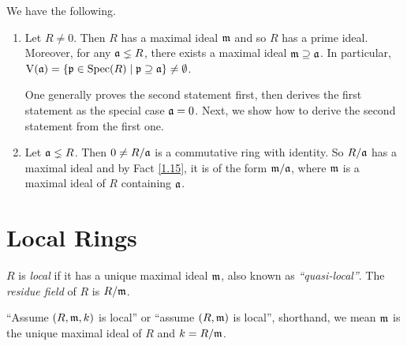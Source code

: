 \begin{fact}\label{1.17}
    We have the following.
    \begin{enumerate}
        \item\label{1.17a}
            Let $R \neq 0$. Then $R$ has a maximal ideal $\mathfrak{m}$ and so $R$ has a prime ideal. Moreover, for any $\mathfrak{a} \lneq R$, there exists a maximal ideal $\mathfrak{m} \supseteq \mathfrak{a}$. In particular, $\operatorname{V}(\mathfrak{a}) = \{\mathfrak{p} \in \operatorname{Spec}(R) \mid \mathfrak{p} \supseteq \mathfrak{a}\} \neq \emptyset$. \par
            One generally proves the second statement first, then derives the first statement as the special case $\mathfrak{a} = 0$. Next, we show how to derive the second statement from the first one.
        \item\label{1.17b}
            Let $\mathfrak{a} \lneq R$. Then $0 \neq R/\mathfrak{a}$ is a commutative ring with identity. So $R/\mathfrak{a}$ has a maximal ideal and by Fact \ref{1.15}, it is of the form $\mathfrak{m}/\mathfrak{a}$, where $\mathfrak{m}$ is a maximal ideal of $R$ containing $\mathfrak{a}$.
    \end{enumerate}
\end{fact}

\section*{Local Rings}

\begin{definition}\label{1.18}
    $R$ is \emph{local} if it has a unique maximal ideal $\mathfrak{m}$, also known as \emph{``quasi-local''}. The \emph{residue field} of $R$ is $R/\mathfrak{m}$. \par
    ``Assume $(R,\mathfrak{m},k)$ is local'' or ``assume $(R,\mathfrak{m})$ is local'', shorthand, we mean $\mathfrak{m}$ is the unique maximal ideal of $R$ and $k = R/\mathfrak{m}$. 
\end{definition}

